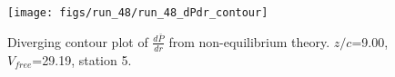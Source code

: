 \begin{figure}[H]
\centering
\texttt{[image: figs/run\_48/run\_48\_dPdr\_contour]}
\caption{Diverging contour plot of $\frac{d\bar{P}}{dr}$ from non-equilibrium theory. $z/c$=9.00, $V_{free}$=29.19, station 5.}
\label{fig:run_48_dPdr_contour}
\end{figure}


